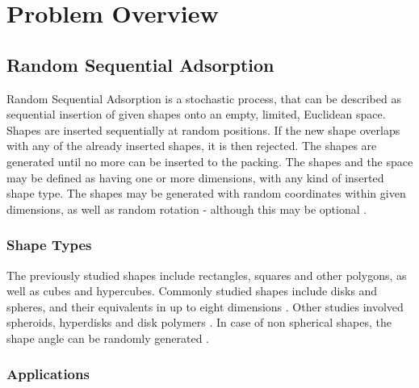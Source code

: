 \documentclass[12pt, oneside]{report}
\begin{document}

\tableofcontents
\newpage


\chapter{Problem Overview}
\section {Random Sequential Adsorption}

Random Sequential Adsorption is a stochastic process, that can be described as sequential insertion of given shapes onto an empty, limited, Euclidean space. Shapes are inserted sequentially at random positions. If the new shape overlaps with any of the already inserted shapes, it is then rejected. The shapes are generated until no more can be inserted to the packing. \newline
The shapes and the space may be defined as having one or more dimensions, with any kind of inserted shape type. The shapes may be generated with random coordinates within given dimensions, as well as random rotation - although this may be optional \cite{zhang,feder}.

\subsection {Shape Types}

The previously studied shapes include rectangles, squares and other polygons, as well as cubes and hypercubes. Commonly studied shapes include disks and spheres, and their equivalents in up to eight dimensions \cite{zhang}. Other studies involved spheroids, hyperdisks and disk polymers \cite{zhang,sherwood_spheroids,ciesla}. In case of non spherical shapes, the shape angle can be randomly generated \cite{zhang}.

\subsection {Applications}
\end{document}
